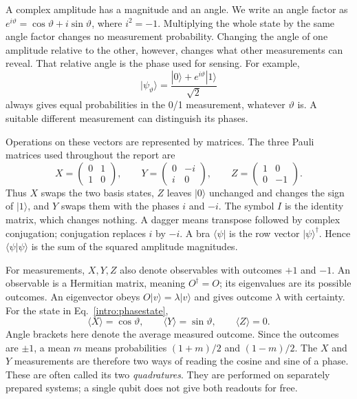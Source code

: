 \documentclass[11pt,a4paper]{article}
\numberwithin{equation}{section}
\theoremstyle{remark}
\begin{document}
A complex amplitude has a magnitude and an angle. We write an angle factor
as $e^{i\vartheta}=\cos\vartheta+i\sin\vartheta$, where $i^2=-1$.
Multiplying the whole state by the same angle factor changes no measurement
probability. Changing the angle of one amplitude relative to the other,
however, changes what other measurements can reveal. That relative angle
is the phase used for sensing. For example,
\begin{equation}
 |\psi_\vartheta\rangle
 =\frac{|0\rangle+e^{i\vartheta}|1\rangle}{\sqrt2}
 \label{intro:phasestate}
\end{equation}
always gives equal probabilities in the 0/1 measurement, whatever
$\vartheta$ is. A suitable different measurement can distinguish its phases.

Operations on these vectors are represented by matrices. The three Pauli
matrices used throughout the report are
\begin{equation}
 X=\begin{pmatrix}0&1\\1&0\end{pmatrix},\qquad
 Y=\begin{pmatrix}0&-i\\i&0\end{pmatrix},\qquad
 Z=\begin{pmatrix}1&0\\0&-1\end{pmatrix}.
 \label{intro:pauli}
\end{equation}
Thus $X$ swaps the two basis states, $Z$ leaves $|0\rangle$ unchanged and
changes the sign of $|1\rangle$, and $Y$ swaps them with the phases $i$
and $-i$. The symbol $I$ is the identity matrix, which changes nothing.
A dagger means transpose followed by complex conjugation; conjugation
replaces $i$ by $-i$. A bra $\langle\psi|$ is the row vector
$|\psi\rangle^\dagger$. Hence $\langle\psi|\psi\rangle$ is the sum of the
squared amplitude magnitudes.

For measurements, $X,Y,Z$ also denote observables with outcomes $+1$ and
$-1$. An observable is a Hermitian matrix, meaning $O^\dagger=O$; its
eigenvalues are its possible outcomes. An eigenvector obeys
$O|v\rangle=\lambda|v\rangle$ and gives outcome $\lambda$ with certainty.
For the state in Eq.~\eqref{intro:phasestate},
\begin{equation}
 \langle X\rangle=\cos\vartheta,\qquad
 \langle Y\rangle=\sin\vartheta,\qquad
 \langle Z\rangle=0.
 \label{intro:quadratures}
\end{equation}
Angle brackets here denote the average measured outcome. Since the outcomes
are $\pm1$, a mean $m$ means probabilities $(1+m)/2$ and $(1-m)/2$.
The $X$ and $Y$ measurements are therefore two ways of reading the cosine
and sine of a phase. These are often called its two \emph{quadratures}.
They are performed on separately prepared systems; a single qubit does not
give both readouts for free.
\end{document}
